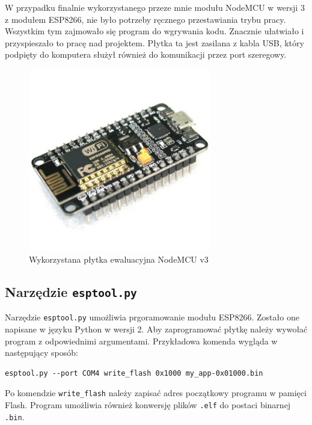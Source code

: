 W przypadku finalnie wykorzystanego przeze mnie modułu NodeMCU w wersji 3 z modułem
ESP8266, nie było potrzeby ręcznego przestawiania trybu pracy. Wszystkim tym zajmowało
się program do wgrywania kodu. Znacznie ułatwiało i przyspieszało to pracę nad projektem.
Płytka ta jest zasilana z kabla USB, który podpięty do komputera służył również do komunikacji
przez port szeregowy.

\begin{figure}[H]
	\centering
    \includegraphics[width=8cm]{./images/nodemcu.jpg}
    \caption{Wykorzystana płytka ewaluacyjna NodeMCU v3}
	\label{esp8266-nodemcu}
\end{figure}
\FloatBarrier

\subsection{Narzędzie \texttt{esptool.py}}
\label{esptool}
Narzędzie \texttt{esptool.py} umożliwia prgoramowanie modułu ESP8266. Zostało one 
napisane w języku Python w wersji 2. Aby zaprogramować płytkę należy wywołać 
program z odpowiednimi argumentami. Przykładowa komenda wygląda w następujący sposób:\\

\begin{lstlisting}[style=customc,
    frame=single,
    caption={Przykładowa komenda programująca moduł ESP8266},
    captionpos=b,
    label={esptool_basic}]
esptool.py --port COM4 write_flash 0x1000 my_app-0x01000.bin
\end{lstlisting}

Po komendzie \texttt{write\_{}flash} należy zapisać adres początkowy programu w 
pamięci Flash. Program umożliwia również konwersję plików \texttt{.elf} do postaci 
binarnej \texttt{.bin}. 

